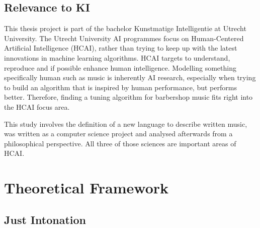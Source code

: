 \documentclass[a4paper]{article}
\begin{document}
\subsection{Relevance to KI}
This thesis project is part of the bachelor Kunstmatige Intelligentie at Utrecht University. The Utrecht University AI programmes focus on Human-Centered Artificial Intelligence (HCAI), rather than trying to keep up with the latest innovations in machine learning algorithms. HCAI targets to understand, reproduce and if possible enhance human intelligence. \cite{utrecht_university_human-centered_2023} Modelling something specifically human such as music is inherently AI research, especially when trying to build an algorithm that is inspired by human performance, but performs better. Therefore, finding a tuning algorithm for barbershop music fits right into the HCAI focus area.

This study involves the definition of a new language to describe written music, was written as a computer science project and analysed afterwards from a philosophical perspective. All three of those sciences are important areas of HCAI.

\section{Theoretical Framework}
\subsection{Just Intonation}
\label{intro_ji}
\end{document}
